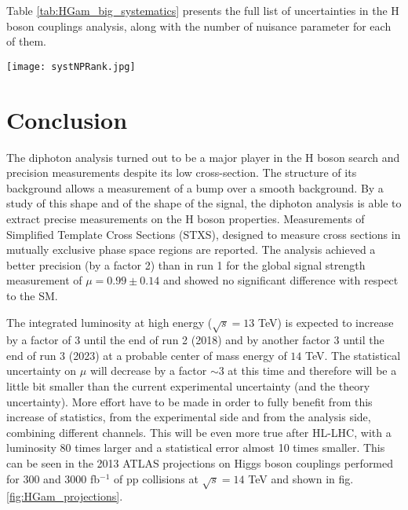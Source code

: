 \begin{enumerate}
  \label{sec:org5b8bbd9}
Table \ref{tab:HGam_big_systematics} presents the full list of uncertainties in the H boson couplings analysis, along with the number of nuisance parameter for each of them.


\begin{table}[h!]
  \begin{center}
    \texttt{[image: systNPRank.jpg]}
\caption{Summary of sources of systematic uncertainty $\sigma_i$ ($i$ is the index to each of the unique nuisance parameters~$\theta$);
the factor in the likelihood function ${F_\mathrm{G}(\sigma,\theta)}$ or ${F_\mathrm{LN}(\sigma,\theta)}$
that implements their impact on signal yields,
mass resolution and scale, and the spurious signals resulting from the background parameterization.%
When acting on $N_\mathrm{S}^\mathrm{tot}$ the  uncertainty value is  the same for  all processes,
whereas  the uncertainty has a different value for each signal process for  the case  denoted~$N_\mathrm{S}^{p}$.
\cite{ATLAS-CONF-2017-045}}
\label{tab:HGam_big_systematics}
\end{center}
\end{table}
\end{enumerate}



\section{Conclusion}
\label{sec:orgffb6129}
The diphoton analysis turned out to be a major player in the H boson search and precision measurements despite its low cross-section.
The structure of its background allows a measurement of a bump over a smooth background.
By a study of this shape and of the shape of the signal, the diphoton analysis is able to extract precise measurements on the H boson properties.
Measurements of Simplified Template Cross Sections (STXS), designed to measure cross sections in mutually exclusive phase space regions are reported.
The analysis achieved a better precision (by a factor 2) than in run 1 for the global signal strength measurement of $\mu=0.99\pm 0.14$ and showed no significant difference with respect to the SM.

The integrated luminosity at high energy ($\sqrt{s}=13$ TeV) is expected to increase by a factor of 3 until the end of run 2 (2018) and by another factor 3 until the end of run 3 (2023) at a probable center of mass energy of $14$ TeV.
The statistical uncertainty on $\mu$ will decrease by a factor $\sim 3$ at this time and therefore will be a little bit smaller than the current experimental uncertainty (and the theory uncertainty).
More effort have to be made in order to fully benefit from this increase of statistics, from the experimental side and from the analysis side, combining different channels.
This will be even more true after HL-LHC, with a luminosity 80 times larger and a statistical error almost 10 times smaller.
This can be seen in the 2013 ATLAS projections on Higgs boson couplings performed for 300 and 3000 fb$^{-1}$ of pp collisions at $\sqrt{s}=14$ TeV \cite{ATL-PHYS-PUB-2013-014} and shown in fig. \ref{fig:HGam_projections}.

